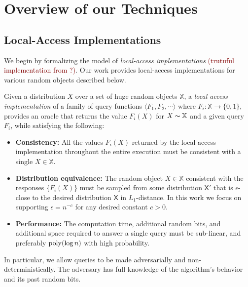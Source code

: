 \section{Overview of our Techniques}
\label{sec:overview_of_our_techniques}
\subsection{Local-Access Implementations}
We begin by formalizing the model of \emph{local-access implementations} \textcolor{Maroon}{(trutuful implementation from \cite{huge}?)}.
Our work provides local-access implementations for various random objects described below.

\begin{definition}
\label{def:local_access}
Given a distribution $X$ over a set of huge random objects $\mathbb X$, a \emph{local access implementation}
of a family of query functions $\langle F_1, F_2,\cdots \rangle$ where $F_i: \mathbb X\rightarrow \{0,1\}$,
provides an oracle that returns the value $F_i(X)$ for $X\thicksim \mathbb X$ and a given query $F_i$, while satisfying the following:
\begin{itemize}
    \item \textbf{Consistency:}
    All the values $F_i(X)$ returned by the local-access implementation throughout the entire execution
    must be consistent with a single $X\in \mathbb X$.
    \item \textbf{Distribution equivalence:}
    The random object $X\in \mathbb X$ consistent with the responses $\{ F_i(X)\}$ must be sampled from some distribution $\mathsf{X}'$
    that is $\epsilon$-close to the desired distribution $\mathsf{X}$ in $L_1$-distance.
    In this work we focus on supporting $\epsilon = n^{-c}$ for any desired constant $c>0$.
    \item \textbf{Performance:}
    The computation time, additional random bits, and additional space required to answer a single query must be sub-linear,
    and preferably $\mathrm{poly}(\log n)$ with high probability.
\end{itemize}
\end{definition}
In particular, we allow queries to be made adversarially and non-deterministically.
The adversary has full knowledge of the algorithm's behavior and its past random bits.




